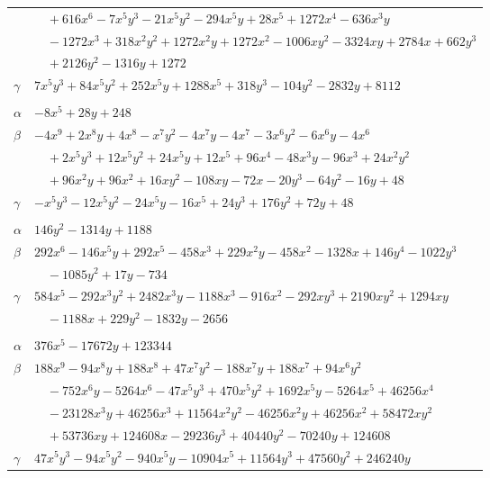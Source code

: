 \documentclass[11pt]{article}
\begin{document}
\begin{longtable}{@{}ll@{}}
 & $\quad +616x^{6}-7x^{5}y^{3}-21x^{5}y^{2}-294x^{5}y+28x^{5}+1272x^{4}-636x^{3}y$\\
 & $\quad -1272x^{3}+318x^{2}y^{2}+1272x^{2}y+1272x^{2}-1006xy^{2}-3324xy+2784x+662y^{3}$\\
 & $\quad +2126y^{2}-1316y+1272$\\
$\gamma$ & $7x^{5}y^{3}+84x^{5}y^{2}+252x^{5}y+1288x^{5}+318y^{3}-104y^{2}-2832y+8112$\\
\addlinespace[3pt]
\multicolumn{2}{@{}l}{$\{i,j\}=\{17,33\}$, $k_{ij}=2^{7}\cdot 7$}\\
$\alpha$ & $-8x^{5}+28y+248$\\
$\beta$ & $-4x^{9}+2x^{8}y+4x^{8}-x^{7}y^{2}-4x^{7}y-4x^{7}-3x^{6}y^{2}-6x^{6}y-4x^{6}$\\
 & $\quad +2x^{5}y^{3}+12x^{5}y^{2}+24x^{5}y+12x^{5}+96x^{4}-48x^{3}y-96x^{3}+24x^{2}y^{2}$\\
 & $\quad +96x^{2}y+96x^{2}+16xy^{2}-108xy-72x-20y^{3}-64y^{2}-16y+48$\\
$\gamma$ & $-x^{5}y^{3}-12x^{5}y^{2}-24x^{5}y-16x^{5}+24y^{3}+176y^{2}+72y+48$\\
\addlinespace[3pt]
\multicolumn{2}{@{}l}{$\{i,j\}=\{18,23\}$, $k_{ij}=2^{2}\cdot 3^{3}\cdot 5\cdot 11$}\\
$\alpha$ & $146y^{2}-1314y+1188$\\
$\beta$ & $292x^{6}-146x^{5}y+292x^{5}-458x^{3}+229x^{2}y-458x^{2}-1328x+146y^{4}-1022y^{3}$\\
 & $\quad -1085y^{2}+17y-734$\\
$\gamma$ & $584x^{5}-292x^{3}y^{2}+2482x^{3}y-1188x^{3}-916x^{2}-292xy^{3}+2190xy^{2}+1294xy$\\
 & $\quad -1188x+229y^{2}-1832y-2656$\\
\addlinespace[3pt]
\multicolumn{2}{@{}l}{$\{i,j\}=\{18,31\}$, $k_{ij}=2^{8}\cdot 3\cdot 5^{3}\cdot 11$}\\
$\alpha$ & $376x^{5}-17672y+123344$\\
$\beta$ & $188x^{9}-94x^{8}y+188x^{8}+47x^{7}y^{2}-188x^{7}y+188x^{7}+94x^{6}y^{2}$\\
 & $\quad -752x^{6}y-5264x^{6}-47x^{5}y^{3}+470x^{5}y^{2}+1692x^{5}y-5264x^{5}+46256x^{4}$\\
 & $\quad -23128x^{3}y+46256x^{3}+11564x^{2}y^{2}-46256x^{2}y+46256x^{2}+58472xy^{2}$\\
 & $\quad +53736xy+124608x-29236y^{3}+40440y^{2}-70240y+124608$\\
$\gamma$ & $47x^{5}y^{3}-94x^{5}y^{2}-940x^{5}y-10904x^{5}+11564y^{3}+47560y^{2}+246240y$\\

\end{longtable}
\end{document}

